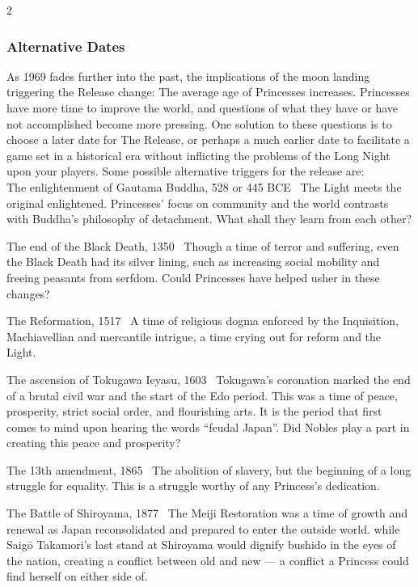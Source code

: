 \begin{multicols}{2}
\bigsidebarstart

\subsubsection*{Alternative Dates}
As 1969 fades further into the past, the implications of the moon landing triggering the Release change: The average age of Princesses increases. Princesses have more time to improve the world, and questions of what they have or have not accomplished become more pressing. One solution to these questions is to choose a later date for The Release, or perhaps a much earlier date to facilitate a game set in a historical era without inflicting the problems of the Long Night upon your players. Some possible alternative triggers for the release are: \\

\textbullet The enlightenment of Gautama Buddha, 528 or 445 BCE \textemdash\, The Light meets the original enlightened. Princesses' focus on community and the world contrasts with Buddha's philosophy of detachment. What shall they learn from each other? 

\textbullet The end of the Black Death, 1350 \textemdash\, Though a time of terror and suffering, even the Black Death had its silver lining, such as increasing social mobility and freeing peasants from serfdom. Could Princesses have helped usher in these changes? 

\textbullet The Reformation, 1517 \textemdash\, A time of religious dogma enforced by the Inquisition, Machiavellian and mercantile intrigue, a time crying out for reform and the Light.

\textbullet The ascension of Tokugawa Ieyasu, 1603 \textemdash\, Tokugawa's coronation marked the end of a brutal civil war and the start of the Edo period. This was a time of peace, prosperity, strict social order, and flourishing arts. It is the period that first comes to mind upon hearing the words \textquotedblleft feudal Japan\textquotedblright . Did Nobles play a part in creating this peace and prosperity?

\textbullet The 13th amendment, 1865 \textemdash\, The abolition of slavery, but the beginning of a long struggle for equality. This is a struggle worthy of any Princess's dedication. 

\textbullet The Battle of Shiroyama, 1877 \textemdash\, The Meiji Restoration was a time of growth and renewal as Japan reconsolidated and prepared to enter the outside world. while Saigō Takamori's last stand at Shiroyama would dignify bushido in the eyes of the nation, creating a conflict between old and new — a conflict a Princess could find herself on either side of. 


\end{multicols}
